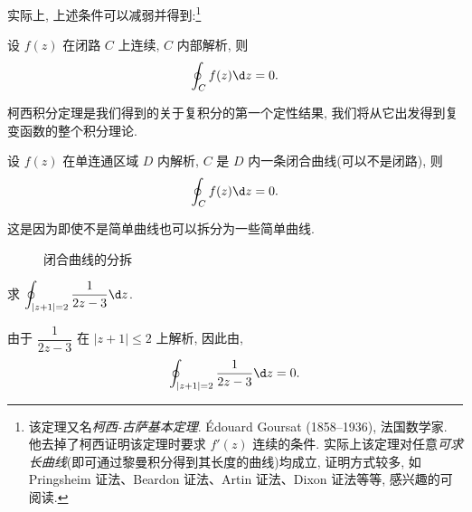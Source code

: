 实际上, 上述条件可以减弱并得到:\footnote{
  该定理又名\emph{柯西-古萨基本定理}. \'Edouard Goursat (1858--1936), 法国数学家. 他去掉了柯西证明该定理时要求 $f'(z)$ 连续的条件.
  实际上该定理对任意\emph{可求长曲线}(即可通过黎曼积分得到其长度的曲线)均成立, 证明方式较多, 如 Pringsheim 证法、Beardon 证法、Artin 证法、Dixon 证法等等, 感兴趣的可阅读\cite{ZZ84,FH87,Ahl22}.
}
\begin{theorem}[柯西积分定理]\label{thm:Cauchy-Goursat}
  设 $f(z)$ 在闭路 $C$ 上连续, $C$ 内部解析, 则
  \[
    \oint_Cf(z)\d z=0.
  \]
\end{theorem}


柯西积分定理是我们得到的关于复积分的第一个定性结果, 我们将从它出发得到复变函数的整个积分理论.

\begin{corollary}
设 $f(z)$ 在单连通区域 $D$ 内解析, $C$ 是 $D$ 内一条闭合曲线(可以不是闭路), 则
\[
  \oint_Cf(z)\d z=0.
\]
\end{corollary}

这是因为即使不是简单曲线也可以拆分为一些简单曲线.

\begin{figure}[!ht]
  \centering
  \caption{闭合曲线的分拆}
\end{figure}



\begin{example}
  求 $\displaystyle\oint_{|z+1|=2}\frac1{2z-3}\d z$.
\end{example}

\begin{solution}
  由于 $\dfrac1{2z-3}$ 在 $|z+1|\le 2$ 上解析,
  因此由\thmCG,
  \[
    \oint_{|z+1|=2}\frac1{2z-3}\d z=0.
  \]
\end{solution}

